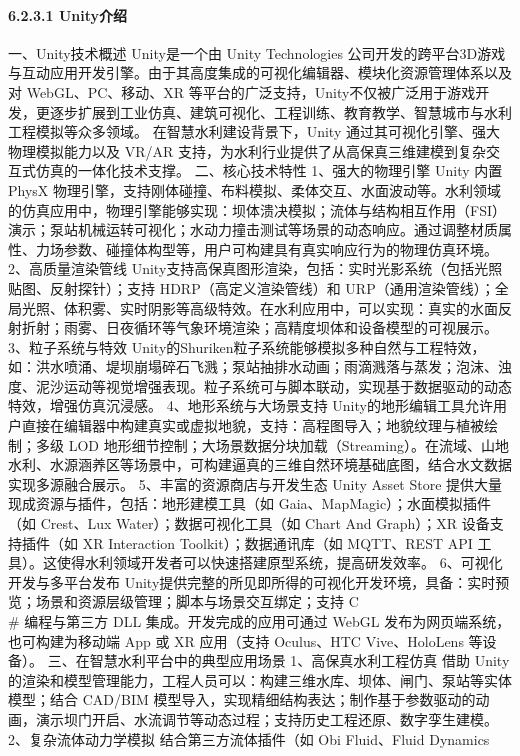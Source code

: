 {\paragraph{6.2.3.1 Unity介绍}\label{unityux4ecbux7ecd} 一、Unity技术概述 Unity是一个由 Unity Technologies
公司开发的跨平台3D游戏与互动应用开发引擎。由于其高度集成的可视化编辑器、模块化资源管理体系以及对 WebGL、PC、移动、XR
等平台的广泛支持，Unity不仅被广泛用于游戏开发，更逐步扩展到工业仿真、建筑可视化、工程训练、教育教学、智慧城市与水利工程模拟等众多领域。 在智慧水利建设背景下，Unity 通过其可视化引擎、强大物理模拟能力以及 VR/AR
支持，为水利行业提供了从高保真三维建模到复杂交互式仿真的一体化技术支撑。 二、核心技术特性 1、强大的物理引擎 Unity 内置PhysX
物理引擎，支持刚体碰撞、布料模拟、柔体交互、水面波动等。水利领域的仿真应用中，物理引擎能够实现：坝体溃决模拟；流体与结构相互作用（FSI）演示；泵站机械运转可视化；水动力撞击测试等场景的动态响应。通过调整材质属性、力场参数、碰撞体构型等，用户可构建具有真实响应行为的物理仿真环境。
2、高质量渲染管线 Unity支持高保真图形渲染，包括：实时光影系统（包括光照贴图、反射探针）；支持 HDRP（高定义渲染管线）和
URP（通用渲染管线）；全局光照、体积雾、实时阴影等高级特效。在水利应用中，可以实现：真实的水面反射折射；雨雾、日夜循环等气象环境渲染；高精度坝体和设备模型的可视展示。 3、粒子系统与特效
Unity的Shuriken粒子系统能够模拟多种自然与工程特效，如：洪水喷涌、堤坝崩塌碎石飞溅；泵站抽排水动画；雨滴溅落与蒸发；泡沫、浊度、泥沙运动等视觉增强表现。粒子系统可与脚本联动，实现基于数据驱动的动态特效，增强仿真沉浸感。
4、地形系统与大场景支持 Unity的地形编辑工具允许用户直接在编辑器中构建真实或虚拟地貌，支持：高程图导入；地貌纹理与植被绘制；多级 LOD
地形细节控制；大场景数据分块加载（Streaming）。在流域、山地水利、水源涵养区等场景中，可构建逼真的三维自然环境基础底图，结合水文数据实现多源融合展示。 5、丰富的资源商店与开发生态 Unity Asset Store
提供大量现成资源与插件，包括：地形建模工具（如 Gaia、MapMagic）；水面模拟插件（如 Crest、Lux Water）；数据可视化工具（如 Chart And Graph）；XR 设备支持插件（如 XR Interaction
Toolkit）；数据通讯库（如 MQTT、REST API 工具）。这使得水利领域开发者可以快速搭建原型系统，提高研发效率。 6、可视化开发与多平台发布
Unity提供完整的所见即所得的可视化开发环境，具备：实时预览；场景和资源层级管理；脚本与场景交互绑定；支持 C\\\# 编程与第三方 DLL 集成。开发完成的应用可通过 WebGL 发布为网页端系统，也可构建为移动端 App 或 XR
应用（支持 Oculus、HTC Vive、HoloLens 等设备）。 三、在智慧水利平台中的典型应用场景 1、高保真水利工程仿真 借助 Unity 的渲染和模型管理能力，工程人员可以：构建三维水库、坝体、闸门、泵站等实体模型；结合
CAD/BIM 模型导入，实现精细结构表达；制作基于参数驱动的动画，演示坝门开启、水流调节等动态过程；支持历史工程还原、数字孪生建模。 2、复杂流体动力学模拟 结合第三方流体插件（如 Obi Fluid、Fluid Dynamics
}
